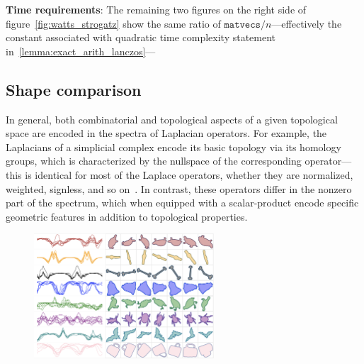 \documentclass[10pt]{article}
\numberwithin{equation}{section}
\newcommand{\+}{%
	\raisebox{0.18ex}{\scaleobj{0.55}{+}}
}
\theoremstyle{definition}
\theoremstyle{definition}
\begin{document}
 \textbf{Time requirements}: The remaining two figures on the right side of figure~\ref{fig:watts_strogatz} show the same ratio of $\mathtt{matvecs}/n$---effectively the constant associated with quadratic time complexity statement in~\ref{lemma:exact_arith_lanczos}---


%

\subsection{Shape comparison}
In general, both combinatorial and topological aspects of a given topological space are encoded in the spectra of Laplacian operators. 
For example, the Laplacians of a simplicial complex encode its basic topology via its homology groups, which is characterized by the nullspace of the corresponding operator---this is identical for most of the Laplace operators, whether they are normalized, weighted, signless, and so on~\cite{}.
In contrast, these operators differ in the nonzero part of the spectrum, which when equipped with a scalar-product encode specific geometric features in addition to topological properties. 

 
\begin{figure}
	\centering
	\includegraphics[width=0.6\textwidth]{shape_signatures}
\end{figure}
\end{document}
